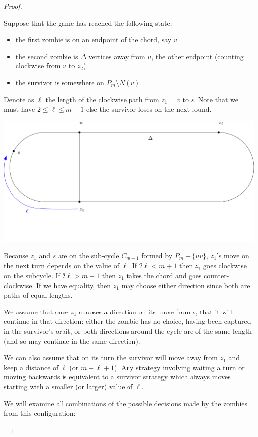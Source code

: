 \documentclass[letterpaper, 10pt]{article}
\begin{document}
\begin{proof}
\begin{proofpart}
Suppose that the game has reached the following state:
\begin{itemize}
\item the first zombie is on an endpoint of the chord, say $v$
\item the second zombie is $\Delta$ vertices away from $u$, the other endpoint (counting clockwise from $u$ to $z_2$).
\item the survivor is somewhere on $P_m \setminus N(v)$.
\end{itemize}
Denote as $\ell$ the length of the clockwise
path from $z_1 = v$ to $s$. Note that we must have $2 \leq \ell \leq m-1$ else the survivor loses on the next round.
\begin{center}
 \includegraphics[scale=0.20]{diagram1}
\end{center}

Because $z_1$ and $s$ are on the sub-cycle $C_{m+1}$ formed by
$P_m + \{uv\}$, $z_1$'s move on the next turn depends on the
value of $\ell$. If $2\ell < m+1$ then $z_1$ goes clockwise
on the subcycle. If $2\ell > m+1$ then $z_1$ takes the chord and
goes counter-clockwise.  If we have equality, then $z_1$ may
choose either direction since both are paths of equal lengths.

We assume that once $z_1$ chooses a direction on its move from $v$,
that it will continue in that direction:
either the zombie has no choice, having been captured in the survivor's orbit,
or both directions around the cycle are of the same length (and so
may continue in the same direction).

We can also assume that on its turn the survivor will move away from
$z_1$ and keep a distance of $\ell$ (or $m-\ell +1$).
Any strategy involving waiting a turn or moving backwards is
equivalent to a survivor strategy which always moves
 starting with a smaller (or larger) value of $\ell$.

We will examine all combinations of the possible decisions
made by the zombies from this configuration:


\end{proofpart}
\end{proof}
\end{document}
